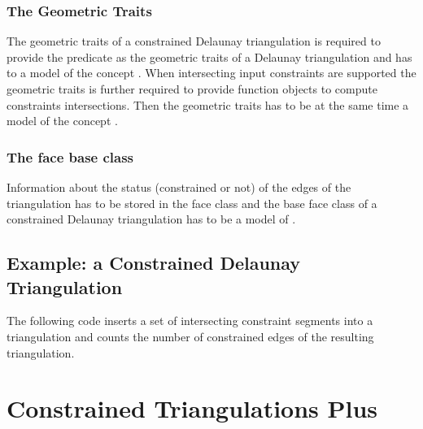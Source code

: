 \subsubsection{The Geometric Traits}
 The geometric traits 
of a constrained Delaunay triangulation is required
to provide the  predicate as the geometric traits
of a Delaunay triangulation and has to a model of the concept
. When intersecting input
constraints
are supported the geometric traits is further required 
to provide function objects to compute constraints intersections.
Then the geometric traits has to be at the same time a model
of the concept .



\subsubsection{The face base class}
Information about the status (constrained or not)
of the edges of the triangulation has to be stored
in the face class
 and the base face class
of a constrained Delaunay triangulation has to be a model
of .




\subsection{Example: a  Constrained Delaunay Triangulation\label{Subsection_2D_Triangulations_Constrained_Delaunay_Example}}
The following code inserts a set of intersecting constraint segments
into a triangulation 
and counts the number of constrained edges of the
resulting triangulation.



\section{Constrained Triangulations Plus\label{Section_2D_Triangulations_Constrained_Plus}}

